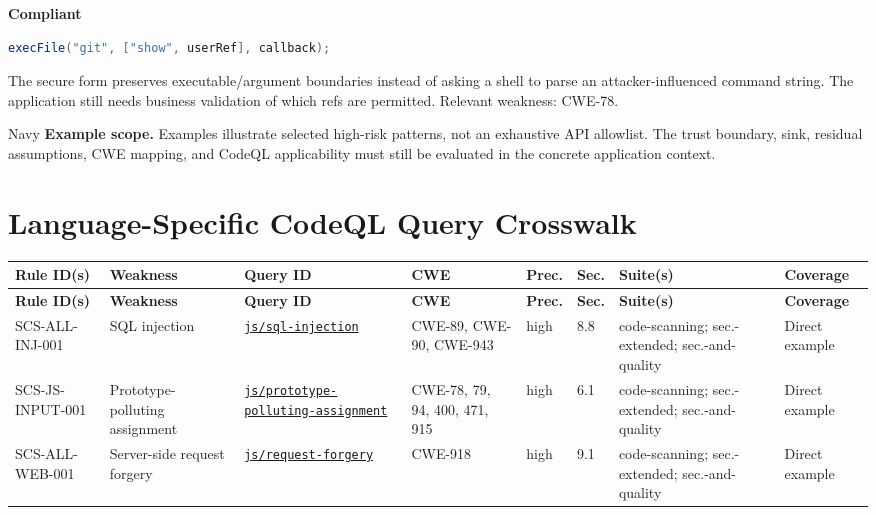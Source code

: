 \documentclass[10pt,letterpaper]{article}
\newcommand{\code}[1]{\texttt{\small #1}}
\begin{document}
\textbf{Compliant}\par
\begin{lstlisting}[language={Java}]
execFile("git", ["show", userRef], callback);
\end{lstlisting}

The secure form preserves executable/argument boundaries instead of asking a shell to parse an attacker-influenced command string. The application still needs business validation of which refs are permitted. Relevant weakness: CWE-78.\par
\begin{callout}{Navy}
\textbf{Example scope.} Examples illustrate selected high-risk patterns, not an exhaustive API allowlist. The trust boundary, sink, residual assumptions, CWE mapping, and CodeQL applicability must still be evaluated in the concrete application context.
\end{callout}
\section{Language-Specific CodeQL Query Crosswalk}\begin{landscape}\scriptsize
\setlength{\tabcolsep}{2.6pt}
\begin{longtable}{@{}P{1.28in}P{1.12in}P{1.52in}P{0.78in}P{0.52in}P{0.48in}P{1.32in}P{0.82in}@{}}
\toprule
\textbf{Rule ID(s)} & \textbf{Weakness} & \textbf{Query ID} & \textbf{CWE} & \textbf{Prec.} & \textbf{Sec.} & \textbf{Suite(s)} & \textbf{Coverage}\\
\midrule
\endfirsthead
\toprule
\textbf{Rule ID(s)} & \textbf{Weakness} & \textbf{Query ID} & \textbf{CWE} & \textbf{Prec.} & \textbf{Sec.} & \textbf{Suite(s)} & \textbf{Coverage}\\
\midrule
\endhead
SCS-ALL-INJ-001 & SQL injection & \href{https://codeql.github.com/codeql-query-help/javascript/js-sql-injection/}{\code{js/sql-injection}} & CWE-89, CWE-90, CWE-943 & high & 8.8 & code-scanning; sec.-extended; sec.-and-quality & Direct example\\
SCS-JS-INPUT-001 & Prototype-polluting assignment & \href{https://codeql.github.com/codeql-query-help/javascript/js-prototype-polluting-assignment/}{\code{js/prototype-polluting-assignment}} & CWE-78, 79, 94, 400, 471, 915 & high & 6.1 & code-scanning; sec.-extended; sec.-and-quality & Direct example\\
SCS-ALL-WEB-001 & Server-side request forgery & \href{https://codeql.github.com/codeql-query-help/javascript/js-request-forgery/}{\code{js/request-forgery}} & CWE-918 & high & 9.1 & code-scanning; sec.-extended; sec.-and-quality & Direct example\\
\bottomrule
\end{longtable}
\normalsize\end{landscape}
\end{document}
